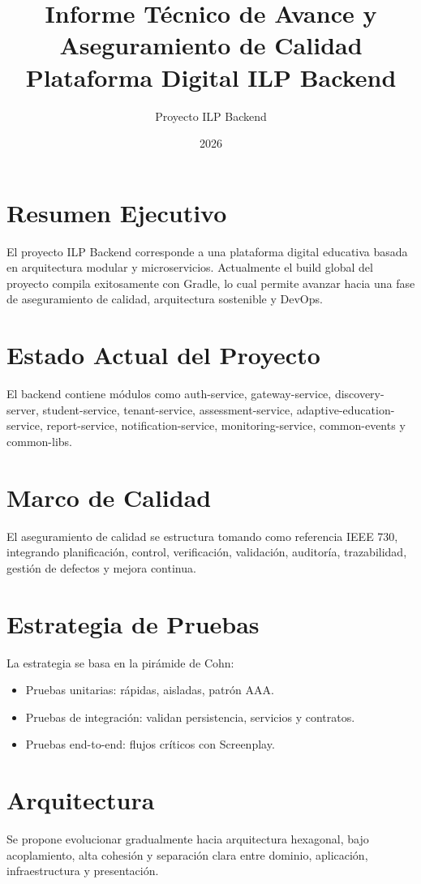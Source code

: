 ﻿\documentclass[12pt,letterpaper]{article}
\title{Informe Técnico de Avance y Aseguramiento de Calidad\\ Plataforma Digital ILP Backend}
\author{Proyecto ILP Backend}
\date{2026}
\begin{document}
\maketitle
\tableofcontents
\newpage

\section{Resumen Ejecutivo}
El proyecto ILP Backend corresponde a una plataforma digital educativa basada en arquitectura modular y microservicios. Actualmente el build global del proyecto compila exitosamente con Gradle, lo cual permite avanzar hacia una fase de aseguramiento de calidad, arquitectura sostenible y DevOps.

\section{Estado Actual del Proyecto}
El backend contiene módulos como auth-service, gateway-service, discovery-server, student-service, tenant-service, assessment-service, adaptive-education-service, report-service, notification-service, monitoring-service, common-events y common-libs.

\section{Marco de Calidad}
El aseguramiento de calidad se estructura tomando como referencia IEEE 730, integrando planificación, control, verificación, validación, auditoría, trazabilidad, gestión de defectos y mejora continua.

\section{Estrategia de Pruebas}
La estrategia se basa en la pirámide de Cohn:
\begin{itemize}
  \item Pruebas unitarias: rápidas, aisladas, patrón AAA.
  \item Pruebas de integración: validan persistencia, servicios y contratos.
  \item Pruebas end-to-end: flujos críticos con Screenplay.
\end{itemize}

\section{Arquitectura}
Se propone evolucionar gradualmente hacia arquitectura hexagonal, bajo acoplamiento, alta cohesión y separación clara entre dominio, aplicación, infraestructura y presentación.
\end{document}
